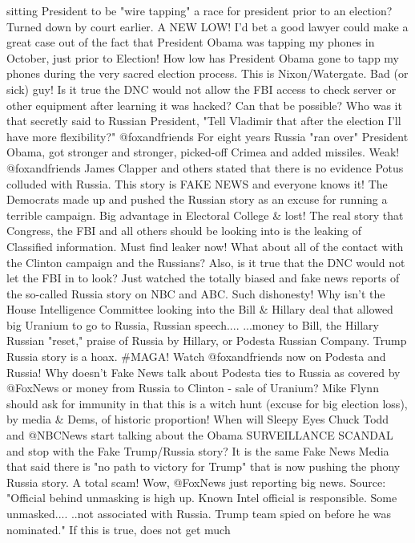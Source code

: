 sitting President to be "wire tapping" a race for president prior to an
election? Turned down by court earlier. A NEW LOW! I'd bet a good lawyer
could make a great case out of the fact that President Obama was tapping
my phones in October, just prior to Election! How low has President
Obama gone to tapp my phones during the very sacred election process.
This is Nixon/Watergate. Bad (or sick) guy! Is it true the DNC would not
allow the FBI access to check server or other equipment after learning
it was hacked? Can that be possible? Who was it that secretly said to
Russian President, "Tell Vladimir that after the election I'll have more
flexibility?" @foxandfriends For eight years Russia "ran over" President
Obama, got stronger and stronger, picked-off Crimea and added missiles.
Weak! @foxandfriends James Clapper and others stated that there is no
evidence Potus colluded with Russia. This story is FAKE NEWS and
everyone knows it! The Democrats made up and pushed the Russian story as
an excuse for running a terrible campaign. Big advantage in Electoral
College \& lost! The real story that Congress, the FBI and all others
should be looking into is the leaking of Classified information. Must
find leaker now! What about all of the contact with the Clinton campaign
and the Russians? Also, is it true that the DNC would not let the FBI in
to look? Just watched the totally biased and fake news reports of the
so-called Russia story on NBC and ABC. Such dishonesty! Why isn't the
House Intelligence Committee looking into the Bill \& Hillary deal that
allowed big Uranium to go to Russia, Russian speech.... ...money to
Bill, the Hillary Russian "reset," praise of Russia by Hillary, or
Podesta Russian Company. Trump Russia story is a hoax. \#MAGA! Watch
@foxandfriends now on Podesta and Russia! Why doesn't Fake News talk
about Podesta ties to Russia as covered by @FoxNews or money from Russia
to Clinton - sale of Uranium? Mike Flynn should ask for immunity in that
this is a witch hunt (excuse for big election loss), by media \& Dems,
of historic proportion! When will Sleepy Eyes Chuck Todd and @NBCNews
start talking about the Obama SURVEILLANCE SCANDAL and stop with the
Fake Trump/Russia story? It is the same Fake News Media that said there
is "no path to victory for Trump" that is now pushing the phony Russia
story. A total scam! Wow, @FoxNews just reporting big news. Source:
"Official behind unmasking is high up. Known Intel official is
responsible. Some unmasked.... ..not associated with Russia. Trump team
spied on before he was nominated." If this is true, does not get much

